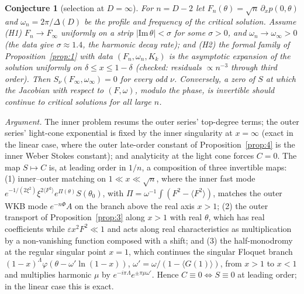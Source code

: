 \documentclass[aps,prd,onecolumn,superscriptaddress,nofootinbib,10pt]{revtex4-2}
\newcommand{\eps}{\varepsilon}
\newtheorem{conjecture}{Conjecture}
\begin{document}
\begin{conjecture}[selection at $D = \infty$]\label{conj}
For $n = D - 2$ let $F_n(\theta) = \sqrt n\,\partial_xp(0,\theta)$ and $\omega_n = 2\pi/\Delta(D)$ be the profile and frequency
of the critical solution. Assume (H1) $F_n \to F_\infty$ uniformly on a strip $|\mathrm{Im}\,\theta| < \sigma$ for some
$\sigma > 0$, and $\omega_n \to \omega_\infty > 0$ (the data give $\sigma \approx 1.4$, the harmonic decay rate); and (H2) the
formal family of Proposition~\ref{prop:1} with data $(F_n, \omega_n, K_k)$ is the asymptotic expansion of the solution
uniformly on $\delta \le x \le 1 - \delta$ (checked: residuals $\propto n^{-3}$ through third order). Then
$S_\nu(F_\infty, \omega_\infty) = 0$ for every odd $\nu$. Conversely, a zero of $S$ at which the Jacobian with respect to
$(F, \omega)$, modulo the phase, is invertible should continue to critical solutions for all large $n$.
\end{conjecture}

\emph{Argument.} The inner problem resums the outer series' top-degree terms; the outer series' light-cone exponential is
fixed by the inner singularity at $x = \infty$ (exact in the linear case, where the outer late-order constant of
Proposition~\ref{prop:4} is the inner Weber Stokes constant); and analyticity at the light cone forces $C = 0$. The map
$S \mapsto C$ is, at leading order in $1/n$, a composition of three invertible maps: (1) inner--outer matching on
$1 \ll x \ll \sqrt n$, where the inner fast mode $e^{-1/(2\xi^2)}\xi^{2\langle F^2\rangle}e^{\Pi(\theta)}S(\theta_0)$, with
$\Pi = \omega^{-1}\!\int(F^2 - \langle F^2\rangle)$, matches the outer WKB mode $e^{-n\Phi}A$ on the branch above the real axis
$x > 1$; (2) the outer transport of Proposition~\ref{prop:3} along $x > 1$ with real $\theta$, which has real coefficients
while $\eps x^2F^2 \ll 1$ and acts along real characteristics as multiplication by a non-vanishing function composed with
a shift; and (3) the half-monodromy at the regular singular point $x = 1$, which continues the singular Floquet branch
$(1-x)^\Lambda\varphi(\theta - \omega'\ln(1-x))$, $\omega' = \omega/(1 - \langle G(1)\rangle)$, from $x > 1$ to $x < 1$ and multiplies
harmonic $\mu$ by $e^{-i\pi\Lambda}e^{\pm\pi\mu\omega'}$. Hence $C \equiv 0 \Leftrightarrow S \equiv 0$ at leading order; in the
linear case this is exact.
\end{document}
